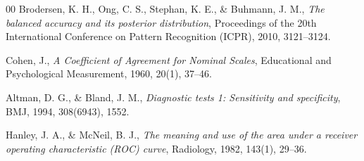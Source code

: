 \documentclass[preprint,12pt,authoryear]{elsarticle}
\begin{document}
\begin{thebibliography}{00}
  Brodersen, K. H., Ong, C. S., Stephan, K. E., \& Buhmann, J. M.,
  \textit{The balanced accuracy and its posterior distribution},
  Proceedings of the 20th International Conference on Pattern Recognition (ICPR), 2010, 3121–3124.

  Cohen, J.,
  \textit{A Coefficient of Agreement for Nominal Scales},
  Educational and Psychological Measurement, 1960, 20(1), 37–46.

  Altman, D. G., \& Bland, J. M.,
  \textit{Diagnostic tests 1: Sensitivity and specificity},
  BMJ, 1994, 308(6943), 1552.

  Hanley, J. A., \& McNeil, B. J.,
  \textit{The meaning and use of the area under a receiver operating characteristic (ROC) curve},
  Radiology, 1982, 143(1), 29–36.


\end{thebibliography}
\end{document}
